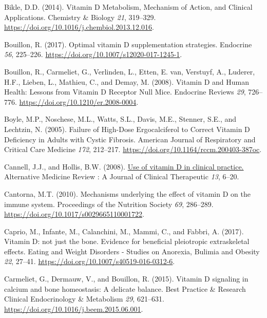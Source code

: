 \documentclass[
  a4paper,
  DIV=11,
  numbers=noendperiod,
  listof=totoc]{scrreprt}
\newlength{\cslhangindent}
\newlength{\cslentryspacingunit} %
\newenvironment{CSLReferences}[2] %
 {%
  \setlength{\parindent}{0pt}
  \ifodd #1
  \let\oldpar\par
  \def\par{\hangindent=\cslhangindent\oldpar}
  \fi
  \setlength{\parskip}{#2\cslentryspacingunit}
 }%
 {}
\begin{document}
\begin{CSLReferences}{0}{0}
\leavevmode{}%
Bikle, D.D. (2014). {Vitamin D Metabolism, Mechanism of Action, and
Clinical Applications}. Chemistry \& Biology \emph{21}, 319--329.
\url{https://doi.org/10.1016/j.chembiol.2013.12.016}.

\leavevmode{}%
Bouillon, R. (2017). {Optimal vitamin D supplementation strategies}.
Endocrine \emph{56}, 225--226.
\url{https://doi.org/10.1007/s12020-017-1245-1}.

\leavevmode{}%
Bouillon, R., Carmeliet, G., Verlinden, L., Etten, E. van, Verstuyf, A.,
Luderer, H.F., Lieben, L., Mathieu, C., and Demay, M. (2008). {Vitamin D
and Human Health: Lessons from Vitamin D Receptor Null Mice}. Endocrine
Reviews \emph{29}, 726--776. \url{https://doi.org/10.1210/er.2008-0004}.

\leavevmode{}%
Boyle, M.P., Noschese, M.L., Watts, S.L., Davis, M.E., Stenner, S.E.,
and Lechtzin, N. (2005). {Failure of High-Dose Ergocalciferol to Correct
Vitamin D Deficiency in Adults with Cystic Fibrosis}. American Journal
of Respiratory and Critical Care Medicine \emph{172}, 212--217.
\url{https://doi.org/10.1164/rccm.200403-387oc}.

\leavevmode{}%
Cannell, J.J., and Hollis, B.W. (2008).
\href{https://www.ncbi.nlm.nih.gov/pubmed/18377099}{{Use of vitamin D in
clinical practice.}} Alternative Medicine Review : A Journal of Clinical
Therapeutic \emph{13}, 6--20.

\leavevmode{}%
Cantorna, M.T. (2010). {Mechanisms underlying the effect of vitamin D on
the immune system}. Proceedings of the Nutrition Society \emph{69},
286--289. \url{https://doi.org/10.1017/s0029665110001722}.

\leavevmode{}%
Caprio, M., Infante, M., Calanchini, M., Mammi, C., and Fabbri, A.
(2017). {Vitamin D: not just the bone. Evidence for beneficial
pleiotropic extraskeletal effects}. Eating and Weight Disorders -
Studies on Anorexia, Bulimia and Obesity \emph{22}, 27--41.
\url{https://doi.org/10.1007/s40519-016-0312-6}.

\leavevmode{}%
Carmeliet, G., Dermauw, V., and Bouillon, R. (2015). {Vitamin D
signaling in calcium and bone homeostasis: A delicate balance}. Best
Practice \& Research Clinical Endocrinology \& Metabolism \emph{29},
621--631. \url{https://doi.org/10.1016/j.beem.2015.06.001}.


\end{CSLReferences}
\end{document}

